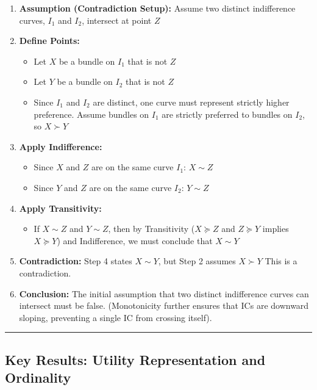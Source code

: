 \documentclass{article}
\begin{document}
\begin{enumerate}
    \item \textbf{Assumption (Contradiction Setup):} Assume two distinct indifference curves, $I_1$ and $I_2$, intersect at point $Z$

    \item \textbf{Define Points:}
    \begin{itemize}
        \item Let $X$ be a bundle on $I_1$ that is not $Z$
        \item Let $Y$ be a bundle on $I_2$ that is not $Z$
        \item Since $I_1$ and $I_2$ are distinct, one curve must represent strictly higher preference. Assume bundles on $I_1$ are strictly preferred to bundles on $I_2$, so $X \succ Y$
    \end{itemize}

    \item \textbf{Apply Indifference:}
    \begin{itemize}
        \item Since $X$ and $Z$ are on the same curve $I_1$: $X \sim Z$
        \item Since $Y$ and $Z$ are on the same curve $I_2$: $Y \sim Z$
    \end{itemize}

    \item \textbf{Apply Transitivity:}
    \begin{itemize}
        \item If $X \sim Z$ and $Y \sim Z$, then by Transitivity ($X \succeq Z$ and $Z \succeq Y$ implies $X \succeq Y$) and Indifference, we must conclude that $X \sim Y$
    \end{itemize}

    \item \textbf{Contradiction:} Step 4 states $X \sim Y$, but Step 2 assumes $X \succ Y$ This is a contradiction.

    \item \textbf{Conclusion:} The initial assumption that two distinct indifference curves can intersect must be false. (Monotonicity further ensures that ICs are downward sloping, preventing a single IC from crossing itself).
\end{enumerate}

\hrule

\subsection*{Key Results: Utility Representation and Ordinality}
\end{document}

